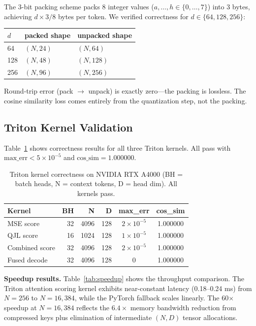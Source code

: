 \documentclass[10pt,twocolumn]{article}
\begin{document}
The 3-bit packing scheme packs 8 integer values ($a, \ldots, h \in \{0, \ldots, 7\}$) into 3 bytes, achieving $d \times 3/8$ bytes per token. We verified correctness for $d \in \{64, 128, 256\}$:

\begin{center}
\begin{tabular}{lll}
\toprule
$d$ & packed shape & unpacked shape \\
\midrule
64  & $(N, 24)$  & $(N, 64)$  \\
128 & $(N, 48)$  & $(N, 128)$ \\
256 & $(N, 96)$  & $(N, 256)$ \\
\bottomrule
\end{tabular}
\end{center}

Round-trip error (pack $\to$ unpack) is exactly zero—the packing is lossless. The cosine similarity loss comes entirely from the quantization step, not the packing.

\subsection{Triton Kernel Validation}
\label{sec:kernels}

Table~\ref{tab:kernels} shows correctness results for all three Triton kernels. All pass with $\text{max\_err} < 5 \times 10^{-5}$ and $\text{cos\_sim} = 1.000000$.

\begin{table}[ht]
\centering
\caption{Triton kernel correctness on NVIDIA RTX A4000 (BH = batch heads, N = context tokens, D = head dim). All kernels pass.}
\label{tab:kernels}
\begin{tabular}{lrrrcc}
\toprule
\textbf{Kernel} & \textbf{BH} & \textbf{N} & \textbf{D} & \textbf{max\_err} & \textbf{cos\_sim} \\
\midrule
MSE score      & 32 & 4096 & 128 & $2\times10^{-5}$ & 1.000000 \\
QJL score      & 16 & 1024 & 128 & $1\times10^{-5}$ & 1.000000 \\
Combined score & 32 & 4096 & 128 & $2\times10^{-5}$ & 1.000000 \\
Fused decode   & 32 & 4096 & 128 & $0$              & 1.000000 \\
\bottomrule
\end{tabular}
\end{table}

\textbf{Speedup results.} Table~\ref{tab:speedup} shows the throughput comparison. The Triton attention scoring kernel exhibits near-constant latency (0.18--0.24 ms) from $N = 256$ to $N = 16{,}384$, while the PyTorch fallback scales linearly. The 60$\times$ speedup at $N = 16{,}384$ reflects the $6.4\times$ memory bandwidth reduction from compressed keys plus elimination of intermediate $(N, D)$ tensor allocations.
\end{document}
